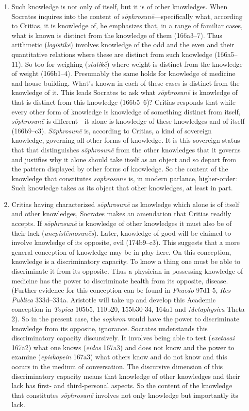 \begin{enumerate}[(1)]
	\item Such knowledge is not only of itself, but it is of other knowledges. When Socrates inquires into the content of \emph{sōphrosunē}—specifically what, according to Critias, it is knowledge of, he emphasizes that, in a range of familiar cases, what is known is distinct from the knowledge of them (166a3–7). Thus arithmetic (\emph{logistikē}) involves knowledge of the odd and the even and their quantitative relations where these are distinct from such knowledge (166a5–11). So too for weighing (\emph{statikē}) where weight is distinct from the knowledge of weight (166b1–4). Presumably the same holds for knowledge of medicine and house-building. What's known in each of these cases is distinct from the knowledge of it. This leads Socrates to ask what \emph{sōphrosunē} is knowledge of that is distinct from this knowledge (166b5–6)? Critias responds that while every other form of knowledge is knowledge of something distinct from itself, \emph{sōphrosunē} is different—it alone is knowledge of these knowledges and of itself (166b9–c3). \emph{Sōphrosunē} is, according to Critias, a kind of sovereign knowledge, governing all other forms of knowledge. It is this sovereign status that that distinguishes \emph{sōphrosunē} from the other knowledges that it governs and justifies why it alone should take itself as an object and so depart from the pattern displayed by other forms of knowledge. So the content of the knowledge that constitutes \emph{sōphrosunē} is, in modern parlance, higher-order: Such knowledge takes as its object that other knowledges, at least in part.
	\item Critias having characterized \emph{sōphrosunē} as knowledge which alone is of itself and other knowledges, Socrates makes an amendation that Critias readily accepts. If \emph{sōphrosunē} is knowledge of other knowledges it must also be of their lack (\emph{anepistēmosunēs}). Later, knowledge of good will be claimed to involve knowledge of its opposite, evil (174b9–c3). This suggests that a more general conception of knowledge may be in play here. On this conception, knowledge is a discriminatory capacity. To know a thing one must be able to discriminate it from its opposite.  Thus a physician in possessing knowledge of medicine has the power to discriminate health from its opposite, disease. (Further evidence for this conception can be found in \emph{Phaedo} 97d1-5, \emph{Res Publica} 333d–334a. Aristotle will take up and develop this Academic conception in \emph{Topica} 105b5, 110b20, 155b30-34, 164a1 and \emph{Metaphysica} Theta 2). So in the present case, the \emph{sophron} would have the power to discriminate knowledge from its opposite, ignorance. Socrates understands this discriminatory capacity discursively. It involves being able to test (\emph{exetasai} 167a2) what one knows (\emph{eidōs} 167a3) and does not know and the power to examine (\emph{episkopein} 167a3) what others know and do not know and this occurs in the medium of conversation. The discursive dimension of this discriminatory capacity means that knowledge of other knowledges and their lack has first- and third-personal aspects. So the content of the knowledge that constitutes \emph{sōphrosunē} involves not only knowledge but importantly its lack. 

\end{enumerate}
